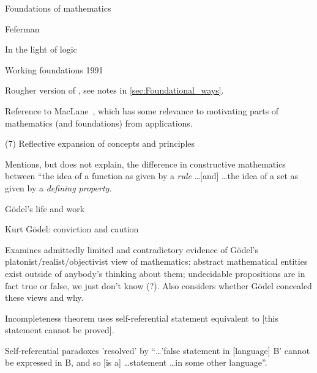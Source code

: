 \begin{plSection}{Foundations of mathematics}
\begin{plSection}{Feferman}
\begin{plSection}{In the light of logic}
\begin{plSection}{Working foundations 1991}
\cite[ch~5 ``Working foundations 1991'']{Feferman:1998:LightOfLogic}

Rougher version of \cite[ch~4]{Feferman:1998:LightOfLogic},
see notes in \cref{sec:Foundational_ways}.

Reference to MacLane~\cite{Maclane:1981:MathModels},
which has some relevance to motivating
parts of mathematics (and foundations)
from applications.

\end{plSection}%
\begin{plSection}{(7) Reflective expansion of concepts and principles}

Mentions, but does not explain, the difference 
in constructive mathematics between
``the idea of a function as given by a \textit{rule}
\ldots [and] \ldots the idea of a set as given by a 
\textit{defining property}.~\cite{Feferman:1979:ConstructiveFunctionsClasses}

\end{plSection}%
\begin{plSection}{G\"{o}del's life and work}
\label{sec:Godels_life_and_work}

\cite[ch~6 ``G\"{o}del's life and work'']{Feferman:1998:LightOfLogic}

\end{plSection}%
\begin{plSection}{Kurt G\"{o}del: conviction and caution}
\label{sec:Kurt_Godel_conviction_and_caution}

Examines admittedly limited and contradictory evidence
of G\"{o}del's platonist/realist/objectivist view of
mathematics: abstract mathematical entities exist outside 
of anybody's thinking about them;
undecidable propositions are in fact true or false, we just don't
know (?).
Also considers whether G\"{o}del concealed these views and 
why.~\cite[ch~7 ``Kurt G\"{o}del: conviction and caution'']{Feferman:1998:LightOfLogic}

Incompleteness theorem uses self-referential statement
equivalent to [this statement cannot be 
proved].~\cite[p~156]{Feferman:1998:LightOfLogic}

Self-referential paradoxes 'resolved' by 
``\ldots 'false statement in [language] B' cannot be expressed in
B, and so [is a] \ldots statement \ldots in some other 
language''.~\cite[p~157]{Feferman:1998:LightOfLogic}


\end{plSection}
\end{plSection}
\end{plSection}
\end{plSection}
